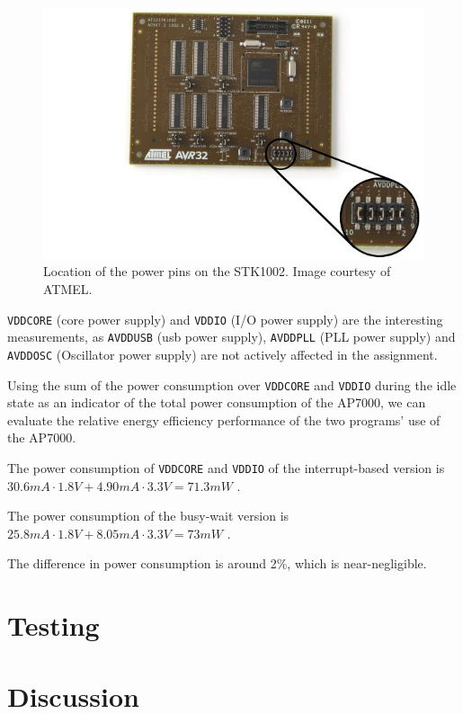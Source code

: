 \begin{figure}
\includegraphics[width = \textwidth]{results-and-tests/power-pins-location.jpg}
\caption{Location of the power pins on the STK1002. Image courtesy of ATMEL.}
\label{power-pins-location}
\end{figure}

\texttt{VDDCORE} (core power supply) and \texttt{VDDIO} (I/O power supply) are the interesting measurements, as \texttt{AVDDUSB} (usb power supply), \texttt{AVDDPLL} (PLL power supply) and \texttt{AVDDOSC} (Oscillator power supply) are not actively affected in the assignment.

Using the sum of the power consumption over \texttt{VDDCORE} and \texttt{VDDIO} during the idle state as an indicator of the total power consumption of the AP7000, we can evaluate the relative energy efficiency performance of the two programs' use of the AP7000.

The power consumption of \texttt{VDDCORE} and \texttt{VDDIO} of the interrupt-based version is 
$
30.6mA \cdot 1.8V +
4.90mA \cdot 3.3V
=
71.3mW
$
.

The power consumption of the busy-wait version is 
$
25.8mA \cdot 1.8V +
8.05mA \cdot 3.3V
=
73mW
$
.


The difference in power consumption is around 2\%, which is near-negligible.

\section{Testing}

	

\section{Discussion}
    
	
